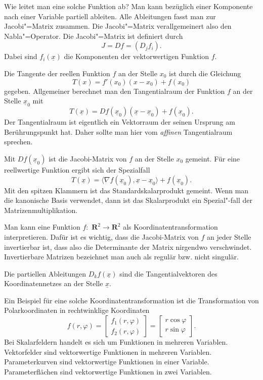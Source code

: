\documentclass[a4paper,10pt,fleqn,twocolumn,twoside]{article}
\begin{document}
Wie leitet man eine solche Funktion ab? Man kann bezüglich einer
Komponente nach einer Variable partiell ableiten. Alle Ableitungen
fasst man zur Jacobi"=Matrix zusammen. Die Jacobi"=Matrix
verallgemeinert also den Nabla"=Operator. Die Jacobi"=Matrix ist
definiert durch
\[J = Df = (D_j f_i).\]
\noindent
Dabei sind $f_i(\underline x)$ die Komponenten der vektorwertigen
Funktion $f$.

Die Tangente der reellen Funktion $f$ an der Stelle $x_0$
ist durch die Gleichung
\[T(x) = f'(x_0)(x-x_0)+f(x_0)\]
%
gegeben. Allgemeiner berechnet man den Tangentialraum der Funktion $f$
an der Stelle $\underline x_0$ mit
\[T(\underline x)
= Df(\underline x_0)(\underline x-\underline x_0)+f(\underline x_0).\]
%
Der Tangentialraum ist eigentlich ein Vektorraum der seinen Ursprung
am Berührungspunkt hat. Daher sollte man hier vom \textit{affinen}
Tangentialraum sprechen.

Mit $Df(\underline x_0)$ ist die Jacobi-Matrix von $f$ an der
Stelle $x_0$ gemeint. Für eine reellwertige Funktion ergibt sich der
Spezialfall
\[T(\underline x) = \langle\nabla f(\underline x_0),\underline x
-\underline x_0\rangle+f(\underline x_0).\]
%
Mit den spitzen Klammern ist das Standardskalarprodukt gemeint.
Wenn man die kanonische Basis verwendet, dann ist das Skalarprodukt
ein Spezial"-fall der Matrizenmultiplikation.

Man kann eine Funktion $f{:}\,\, \mathbf R^2\rightarrow \mathbf R^2$
als Koordinatentransformation interpretieren. Dafür ist es wichtig,
dass die Jacobi-Matrix von $f$ an jeder Stelle invertierbar ist,
dass also die Determinante der Matrix nirgendwo verschwindet.
Invertierbare Matrizen bezeichnet man auch als regulär bzw.
nicht singulär.

Die partiellen Ableitungen $D_kf(\underline x)$ sind die
Tangentialvektoren des Koordinatennetzes an der Stelle
$\underline x$.

Ein Beispiel für eine solche Koordinatentransformation ist die
Transformation von Polarkoordinaten in rechtwinklige Koordinaten
\[f(r,\varphi)
= \begin{bmatrix}
f_1(r,\varphi)\\
f_2(r,\varphi)
\end{bmatrix}
= \begin{bmatrix}
r\cos\varphi\\
r\sin\varphi
\end{bmatrix}.\]
\noindent
Bei Skalarfeldern handelt es sich um Funktionen in mehreren
Variablen. Vektorfelder sind vektorwertige Funktionen in mehreren
Variablen. Parameterkurven sind vektorwertige Funktionen in einer
Variable. Parameterflächen sind vektorwertige Funktionen in zwei
Variablen.
\end{document}
